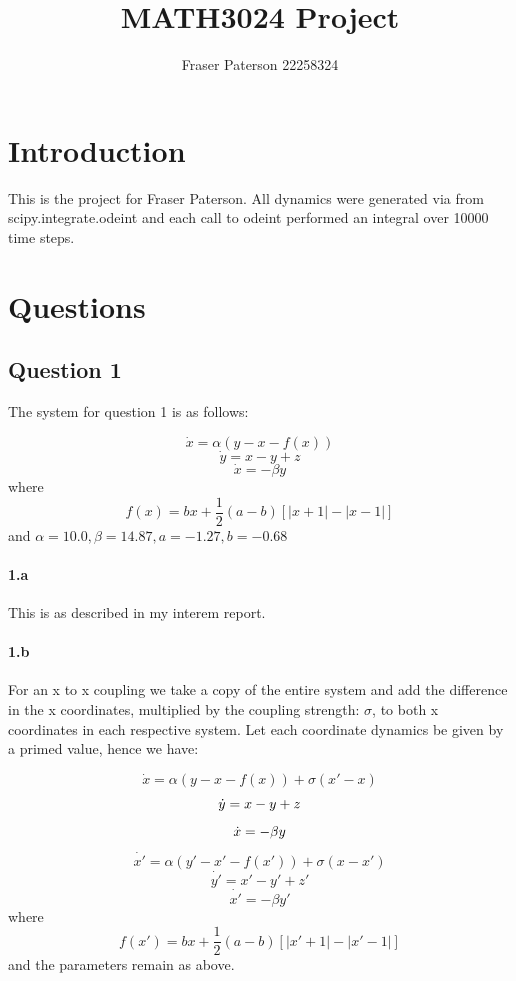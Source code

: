 \documentclass{article}
\author{Fraser Paterson 22258324}
\title{MATH3024 Project}
\begin{document}
\maketitle

\section*{Introduction}

This is the project for Fraser Paterson.
All dynamics were generated via from scipy.integrate.odeint and each call to odeint performed an integral over 10000 time steps.

\section*{Questions}

\subsection*{Question 1}

The system for question 1 is as follows:

$$\dot{x} = \alpha(y - x - f(x))$$
$$\dot{y} = x - y + z$$
$$\dot{x} = -\beta y$$
where
$$f(x) = bx + \frac{1}{2}(a - b)[|x + 1| - |x - 1|]$$
and $\alpha = 10.0, \beta = 14.87, a = -1.27, b = -0.68$

\paragraph{1.a} This is as described in my interem report.

\paragraph{1.b} For an x to x coupling we take a copy of the entire system and add the
difference in the x coordinates, multiplied by the coupling strength: $\sigma$, to both x coordinates
in each respective system. Let each coordinate dynamics
be given by a primed value, hence we have:

$$\dot{x} = \alpha(y - x - f(x)) + \sigma(x' - x)$$
$$\dot{y} = x - y + z\newline$$
$$\dot{x} = -\beta y\newline$$
$$\dot{x'} = \alpha(y' - x' - f(x')) +\sigma(x - x')$$
$$\dot{y'} = x' - y' + z'$$
$$\dot{x'} = -\beta y'$$
where
$$f(x') = bx + \frac{1}{2}(a - b)[|x' + 1| - |x' - 1|]$$
and the parameters remain as above.
\end{document}
